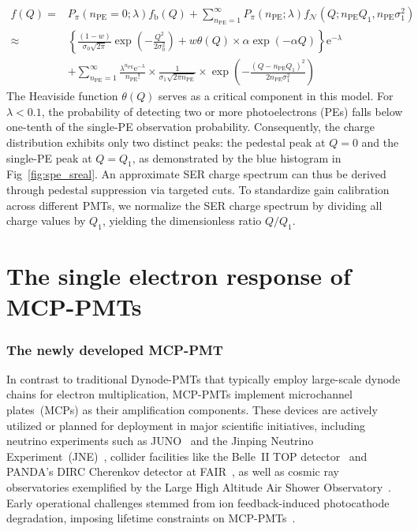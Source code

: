 \begin{equation}
	\begin{aligned}
		f(Q) =  & P_{\pi}(n_{\mathrm{PE}}=0;\lambda)f_{\mathrm{b}}(Q) + \sum_{n_{\mathrm{PE}}=1}^{\infty}P_{\pi}(n_{\mathrm{PE}};\lambda) f_{\mathcal{N}}(Q; n_{\mathrm{PE}}Q_1,n_{\mathrm{PE}}\sigma_1^2) \\
		\approx & \left\{\frac{(1-w)}{\sigma_0 \sqrt{2 \pi}} \exp \left(-\frac{Q^2}{2 \sigma_0^2}\right)
		+w \theta(Q)\times \alpha \exp \left(-\alpha Q\right)\right\} \mathrm{e}^{-\lambda}                                                                                                                \\
		        & +\sum_{n_{\mathrm{PE}}=1}^{\infty} \frac{\lambda^{n_{\mathrm{PE}}} \mathrm{e}^{-\lambda}}{n_{\mathrm{PE}} !}
		\times \frac{1}{\sigma_1 \sqrt{2 \pi n_{\mathrm{PE}}}}\times
		\exp \left(-\frac{\left(Q-n_{\mathrm{PE}} Q_1\right)^2}{2 n_{\mathrm{PE}} \sigma_1^2}\right)
	\end{aligned}
	\label{eq:sreal}
\end{equation}
The Heaviside function $\theta(Q)$ serves as a critical component in this model. For $\lambda < 0.1$, the probability of detecting two or more photoelectrons (PEs) falls below one-tenth of the single-PE observation probability. Consequently, the charge distribution exhibits only two distinct peaks: the pedestal peak at $Q=0$ and the single-PE peak at $Q=Q_1$, as demonstrated by the blue histogram in Fig~\ref{fig:spe_sreal}.
An approximate SER charge spectrum can thus be derived through pedestal suppression via targeted cuts. To standardize gain calibration across different PMTs, we normalize the SER charge spectrum by dividing all charge values by $Q_1$, yielding the dimensionless ratio $Q/Q_1$.

\section{The single electron response of MCP-PMTs}
\subsubsection{The newly developed MCP-PMT}
In contrast to traditional Dynode-PMTs that typically employ large-scale dynode chains for electron multiplication, MCP-PMTs implement microchannel plates~(MCPs) as their amplification components. These devices are actively utilized or planned for deployment in major scientific initiatives, including neutrino experiments such as JUNO~\cite{ZHU2020162002} and the Jinping Neutrino Experiment~(JNE)~\cite{Zhang:2023ued}, collider facilities like the Belle~II TOP detector~\cite{MATSUOKA2014148} and PANDA's DIRC Cherenkov detector at FAIR~\cite{KRAUSS2023168659}, as well as cosmic ray observatories exemplified by the Large High Altitude Air Shower Observatory~\cite{Cao2019UpgradingPT}. Early operational challenges stemmed from ion feedback-induced photocathode degradation, imposing lifetime constraints on MCP-PMTs~\cite{N2006Lifetime}.

